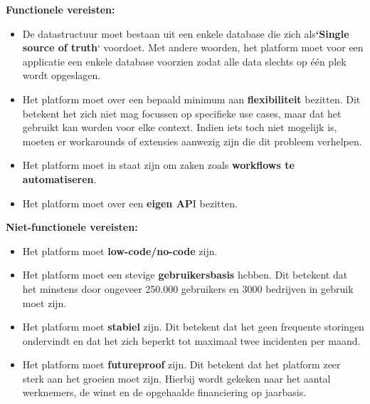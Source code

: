 \textbf{Functionele vereisten:} %

\begin{itemize}
    \item De datastructuur moet bestaan uit een enkele database die zich als\textbf{`Single source of truth}` voordoet. Met andere woorden, het platform moet voor een applicatie een enkele database voorzien zodat alle data slechts op één plek wordt opgeslagen.
    \item Het platform moet over een bepaald minimum aan \textbf{flexibiliteit} bezitten. Dit betekent het zich niet mag focussen op specifieke use cases, maar dat het gebruikt kan worden voor elke context. Indien iets toch niet mogelijk is, moeten er workarounds of extensies aanwezig zijn die dit probleem verhelpen.
    \item Het platform moet in staat zijn om zaken zoals \textbf{workflows te automatiseren}.
    \item Het platform moet over een \textbf{eigen AP}I bezitten.
\end{itemize}

\textbf{Niet-functionele vereisten:} %

\begin{itemize}
    \item Het platform moet \textbf{low-code/no-code} zijn.
    \item Het platform moet een stevige \textbf{gebruikersbasis} hebben. Dit betekent dat het minstens door ongeveer 250.000 gebruikers en 3000 bedrijven in gebruik moet zijn.
    \item Het platform moet \textbf{stabiel} zijn. Dit betekent dat het geen frequente storingen ondervindt en dat het zich beperkt tot maximaal twee incidenten per maand.
    \item Het platform moet \textbf{futureproof} zijn. Dit betekent dat het platform zeer sterk aan het groeien moet zijn. Hierbij wordt gekeken naar het aantal werknemers, de winst en de opgehaalde financiering op jaarbasis.
\end{itemize}


